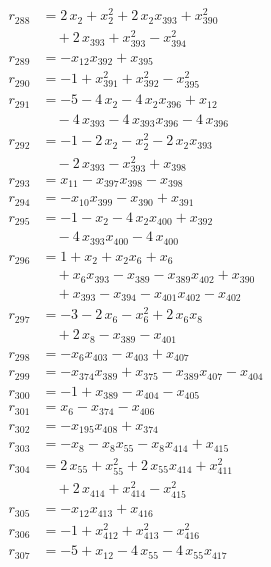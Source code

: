 \begin{align*}
r_{288} &= 2\,x_{2} + x_{2}^{2} + 2\,x_{2} x_{393} + x_{390}^{2} \\
&\quad{}+ 2\,x_{393} + x_{393}^{2} - x_{394}^{2} \\
r_{289} &= -x_{12} x_{392} + x_{395} \\
r_{290} &= -1 + x_{391}^{2} + x_{392}^{2} - x_{395}^{2} \\
r_{291} &= -5 - 4\,x_{2} - 4\,x_{2} x_{396} + x_{12} \\
&\quad{}- 4\,x_{393} - 4\,x_{393} x_{396} - 4\,x_{396} \\
r_{292} &= -1 - 2\,x_{2} - x_{2}^{2} - 2\,x_{2} x_{393} \\
&\quad{}- 2\,x_{393} - x_{393}^{2} + x_{398} \\
r_{293} &= x_{11} - x_{397} x_{398} - x_{398} \\
r_{294} &= -x_{10} x_{399} - x_{390} + x_{391} \\
r_{295} &= -1 - x_{2} - 4\,x_{2} x_{400} + x_{392} \\
&\quad{}- 4\,x_{393} x_{400} - 4\,x_{400} \\
r_{296} &= 1 + x_{2} + x_{2} x_{6} + x_{6} \\
&\quad{}+ x_{6} x_{393} - x_{389} - x_{389} x_{402} + x_{390} \\
&\quad{}+ x_{393} - x_{394} - x_{401} x_{402} - x_{402} \\
r_{297} &= -3 - 2\,x_{6} - x_{6}^{2} + 2\,x_{6} x_{8} \\
&\quad{}+ 2\,x_{8} - x_{389} - x_{401} \\
r_{298} &= -x_{6} x_{403} - x_{403} + x_{407} \\
r_{299} &= -x_{374} x_{389} + x_{375} - x_{389} x_{407} - x_{404} \\
r_{300} &= -1 + x_{389} - x_{404} - x_{405} \\
r_{301} &= x_{6} - x_{374} - x_{406} \\
r_{302} &= -x_{195} x_{408} + x_{374} \\
r_{303} &= -x_{8} - x_{8} x_{55} - x_{8} x_{414} + x_{415} \\
r_{304} &= 2\,x_{55} + x_{55}^{2} + 2\,x_{55} x_{414} + x_{411}^{2} \\
&\quad{}+ 2\,x_{414} + x_{414}^{2} - x_{415}^{2} \\
r_{305} &= -x_{12} x_{413} + x_{416} \\
r_{306} &= -1 + x_{412}^{2} + x_{413}^{2} - x_{416}^{2} \\
r_{307} &= -5 + x_{12} - 4\,x_{55} - 4\,x_{55} x_{417} \\

\end{align*}
